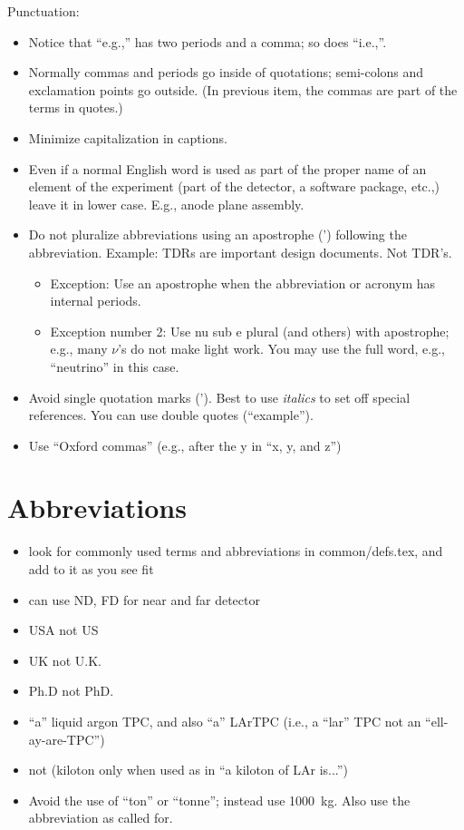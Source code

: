 Punctuation:
\begin{itemize}
\item Notice that ``e.g.,'' has two periods and a comma; so does ``i.e.,''.
\item Normally commas and periods go inside of quotations;  semi-colons and exclamation points go outside.  (In previous item, the commas are part of the terms in quotes.)
\item Minimize capitalization in captions.
\item Even if a normal English word is used as part of the proper name of an element of the experiment (part of the detector, a software package, etc.,) leave it in lower case. E.g., anode plane assembly. 
\item Do not pluralize abbreviations using an apostrophe (') following the abbreviation. Example: TDRs are important design documents. Not TDR's. 
\begin{itemize}
\item Exception: Use an apostrophe when the abbreviation or acronym has internal periods. 
\item Exception number \num{2}: Use nu sub e plural (and others) with apostrophe; e.g., many $\nu$'s do not make light work. You may use the full word, e.g., ``neutrino'' in this case.
\end{itemize}
\item Avoid single quotation marks ('). Best to use \textit{italics} to set off special references. You can use double quotes (``example''). 
\item Use ``Oxford commas'' (e.g., after the y in ``x, y, and z'') 
\end{itemize}


\section{Abbreviations}
\label{sec:english-abbrevs}

\begin{itemize}
\item look for commonly used terms and abbreviations in common/defs.tex, and add to it as you see fit 
\item can use ND, FD for near and far detector
\item USA not US
\item UK not U.K. 
\item Ph.D not PhD.
\item ``a'' liquid argon TPC, and also ``a'' LArTPC (i.e., a ``lar'' TPC not an ``ell-ay-are-TPC'') 
\item \si{\kt} not \si{\kton} (kiloton only when used as in ``a kiloton of LAr is...'') 
\item Avoid the use of ``ton'' or ``tonne''; instead use \SI{1000}{\kilo\gram}. Also use the abbreviation \si{\kt} as called for.

\end{itemize}

